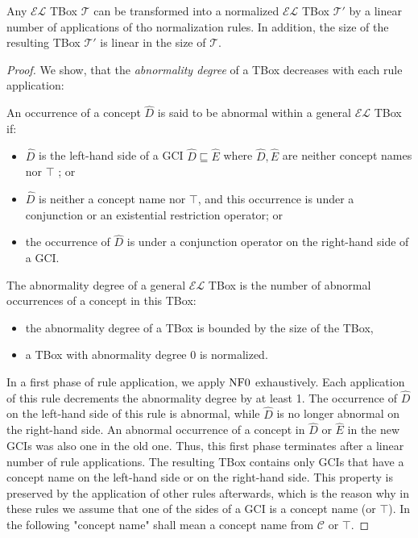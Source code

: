 \begin{lemma}
	Any $\mathcal{EL}$ TBox $\mathcal{T}$ can be transformed into a normalized $\mathcal{EL}$ TBox $\mathcal{T}'$ 
	by a linear number of applications of tho normalization rules.
	In addition, the size of the resulting TBox $\mathcal{T}'$ is linear in the size of $\mathcal{T}$.
\end{lemma}
\begin{proof}
	We show, that the \textit{abnormality degree} of a TBox decreases with each rule application:

		An occurrence of a concept $\widehat{D}$ is said to be abnormal within a general $\mathcal{EL}$ TBox if:
		\begin{itemize}
			\item $\widehat{D}$ is the left-hand side of a GCI $\widehat{D} \sqsubseteq \widehat{E}$ 
				where $\widehat{D}, \widehat{E}$ are neither concept names nor $\top$ ; or
			\item $\widehat{D}$ is neither a concept name nor $\top$,
				and this occurrence is under a conjunction or an existential restriction operator; or
			\item the occurrence of $\widehat{D}$ is under a conjunction operator on the right-hand side of a GCI.
		\end{itemize}

		The abnormality degree of a general $\mathcal{EL}$ TBox is the number of abnormal occurrences of a concept in this TBox:
		\begin{itemize}
			\item the abnormality degree of a TBox is bounded by the size of the TBox,
			\item a TBox with abnormality degree $0$ is normalized.
		\end{itemize}

		In a first phase of rule application, we apply $\mathit{\text{NF0}}$ exhaustively.
		Each application of this rule decrements the abnormality degree by at least 1.
		The occurrence of $\widehat{D}$ on the left-hand side of this rule is abnormal,
		while $\widehat{D}$ is no longer abnormal on the right-hand side.
		An abnormal occurrence of a concept in $\widehat{D}$ or $\widehat{E}$
		in the new GCIs was also one in the old one.
		Thus, this first phase terminates after a linear number of rule applications.
		The resulting TBox contains only GCIs that have a concept name on the left-hand side or on the right-hand side.
		This property is preserved by the application of other rules afterwards,
		which is the reason why in these rules we assume that one of the sides of a GCI is a concept name (or $\top$).
		In the following "concept name" shall mean a concept name from $\mathscr{C}$ or $\top$.


\end{proof}
